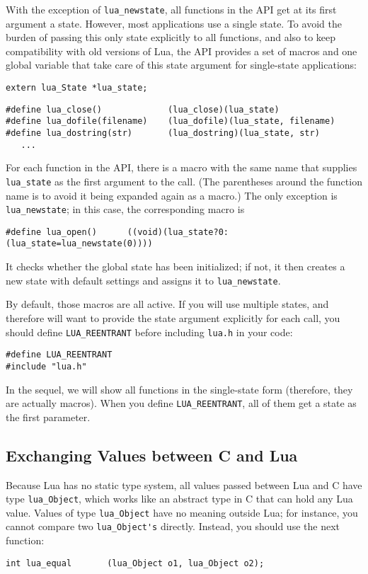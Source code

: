 \documentclass[11pt]{article}
\newcommand{\T}[1]{{\tt #1}}
\newcommand{\IndexVerb}[1]{\T{#1}\index{#1}}
\newcommand{\Deffunc}[1]{\index{#1}}
\begin{document}
With the exception of \verb|lua_newstate|,
all functions in the API get at its first argument a state.
However, most applications use a single state.
To avoid the burden of passing this only state explicitly to all
functions, and also to keep compatibility with old versions of Lua,
the API provides a set of macros and one global variable that
take care of this state argument for single-state applications:
\begin{verbatim}
extern lua_State *lua_state;
\end{verbatim}
\begin{verbatim}
#define lua_close()             (lua_close)(lua_state)
#define lua_dofile(filename)    (lua_dofile)(lua_state, filename)
#define lua_dostring(str)       (lua_dostring)(lua_state, str)
   ...
\end{verbatim}
For each function in the API, there is a macro with the same name
that supplies \verb|lua_state| as the first argument to the call.
(The parentheses around the function name is to avoid it being expanded
again as a macro.)
The only exception is \verb|lua_newstate|;
in this case, the corresponding macro is
\begin{verbatim}
#define lua_open()      ((void)(lua_state?0:(lua_state=lua_newstate(0))))
\end{verbatim}
It checks whether the global state has been initialized;
if not, it then creates a new state with default settings and
assigns it to \verb|lua_newstate|.

By default, those macros are all active.
If you will use multiple states,
and therefore will want to provide the state
argument explicitly for each call,
you should define \IndexVerb{LUA_REENTRANT} before
including \verb|lua.h| in your code:
\begin{verbatim}
#define LUA_REENTRANT
#include "lua.h"
\end{verbatim}

In the sequel, we will show all functions in the single-state form
(therefore, they are actually macros).
When you define \verb|LUA_REENTRANT|,
all of them get a state as the first parameter.


\subsection{Exchanging Values between C and Lua} \label{valuesCLua}
Because Lua has no static type system,
all values passed between Lua and C have type
\verb|lua_Object|\Deffunc{lua_Object},
which works like an abstract type in C that can hold any Lua value.
Values of type \verb|lua_Object| have no meaning outside Lua;
for instance,
you cannot compare two \verb|lua_Object's| directly.
Instead, you should use the next function:
\Deffunc{lua_equal}
\begin{verbatim}
int lua_equal       (lua_Object o1, lua_Object o2);
\end{verbatim}
\end{document}
